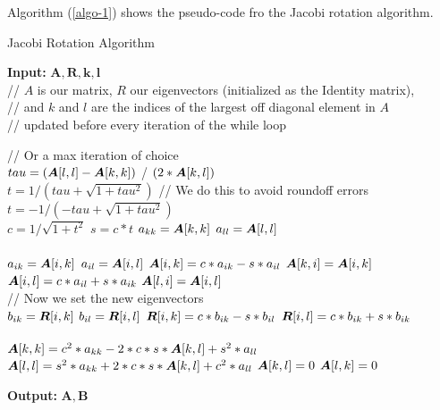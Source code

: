 \documentclass[a4paper]{article}
\begin{document}
Algorithm (\ref{algo-1}) shows the pseudo-code fro the Jacobi rotation algorithm.


\begin{algorithm}[H]
\label{algo-1}
\caption{Jacobi Rotation Algorithm}\label{algo-jacobi_rotate}
\textbf{Input:} $\mathbf{A},\mathbf{R},\mathbf{k},\mathbf{l}$\\ \qquad	// \mbox{\boldmath$A$} is our matrix, \mbox{\boldmath$R$} our eigenvectors (initialized as the Identity matrix),\\
// and $k$ and $l$ are the indices of the largest off diagonal  element in \mbox{\boldmath$A$} \\
// updated before every iteration of the while loop
\begin{algorithmic}[1]

 \qquad// Or a max iteration of choice
\\
\State $tau=( \mbox{\boldmath$A$}[l,l] - \mbox{\boldmath$A$}[k,k])$ / $(2*\mbox{\boldmath$A$}[k,l])$	\qquad	  
\\
    \State $t=1/(tau + \sqrt{1 + tau^2})$   // We do this to avoid roundoff errors
\Else
    \State $t=-1/(-tau + \sqrt{1 + tau^2})$
\EndIf
\\
\State $c=1/\sqrt{1+t^2}$  
\State $s=c*t$ 
\State $a_{kk}=\mbox{\boldmath$A$}[k,k]$	
\State $a_{ll}=\mbox{\boldmath$A$}[l,l]$  
\\

   \\ 

\State $a_{ik} = \mbox{\boldmath$A$}[i,k]$
\State $a_{il} = \mbox{\boldmath$A$}[i,l]$
\State $\mbox{\boldmath$A$}[i,k] = c*a_{ik} - s*a_{il}$
\State $\mbox{\boldmath$A$}[k,i] = \mbox{\boldmath$A$}[i,k]$
\State $\mbox{\boldmath$A$}[i,l] = c*a_{il} + s*a_{ik}$
\State $\mbox{\boldmath$A$}[l,i] = \mbox{\boldmath$A$}[i,l]$\\
\EndIf \qquad// Now we set the new eigenvectors\\
\State $b_{ik} = \mbox{\boldmath$R$}[i,k]$
\State $b_{il} = \mbox{\boldmath$R$}[i,l]$
\State $\mbox{\boldmath$R$}[i,k] = c*b_{ik} - s*b_{il}$
\State $\mbox{\boldmath$R$}[i,l] = c*b_{ik} + s*b_{ik}$
\\
\EndFor \\
\State $\mbox{\boldmath$A$}[k,k]=c^2*a_{kk} - 2*c*s*\mbox{\boldmath$A$}[k,l] + s^2*a_{ll}$	
\State $\mbox{\boldmath$A$}[l,l]=s^2*a_{kk} + 2*c*s*\mbox{\boldmath$A$}[k,l] + c^2*a_{ll}$	
\State $\mbox{\boldmath$A$}[k,l]=0$	
\State $\mbox{\boldmath$A$}[l,k]=0$	\\
\EndWhile
\end{algorithmic}
\textbf{Output:} $\mathbf{A}, \mathbf{B}$
\end{algorithm}
\end{document}
